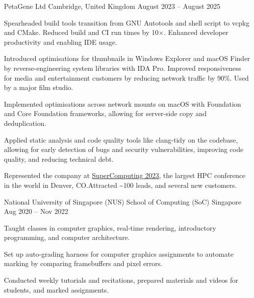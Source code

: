\begin{cventries}
	{PetaGene Ltd} %
	{Cambridge, United Kingdom} %
	{August 2023 -- August 2025} %
	{
		\begin{cvitems} %
			\item Spearheaded build tools transition from GNU Autotools and shell script to vcpkg and CMake.
			Reduced build and CI run times by 10\(\times\).
			Enhanced developer productivity and enabling IDE usage.
			\item Introduced optimisations for thumbnails in Windows Explorer and macOS Finder by reverse-engineering system libraries with IDA Pro. Improved responsiveness for media and entertainment customers by reducing network traffic by 90\%. Used by a major film studio.
			\item Implemented optimisations across network mounts on macOS with Foundation and Core Foundation frameworks, allowing for server-side copy and deduplication.
			\item Applied static analysis and code quality tools like clang-tidy on the codebase, allowing for early detection of bugs and security vulnerabilities, improving code quality, and reducing technical debt.
			\item Represented the company at \href{https://hallerickson.ungerboeck.com/prod/app85.cshtml?aat=5663535078317a434974474478437845326c2b766b2b4c562b355033396d433556704e2b3065744c5161773d&ExhibitorID=7040}{SuperComputing 2023}, the largest HPC conference in the world in Denver, CO.\@ Attracted \textasciitilde100 leads, and several new customers.
		\end{cvitems}
	}


	{National University of Singapore (NUS) School of Computing (SoC)} %
	{Singapore} %
	{Aug 2020 -- Nov 2022} %
	{
		\begin{cvitems} %
			\item Taught classes in computer graphics, real-time rendering, introductory programming, and computer architecture.
			\item Set up auto-grading harness for computer graphics assignments to automate marking by comparing framebuffers and pixel errors.
			\item Conducted weekly tutorials and recitations, prepared materials and videos for students, and marked assignments.
		\end{cvitems}
	}


\end{cventries}
